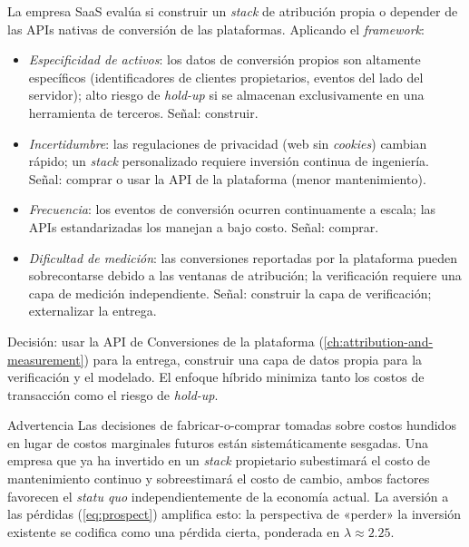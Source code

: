 \begin{example}
La empresa SaaS evalúa si construir un \emph{stack} de atribución propia o depender de las APIs
nativas de conversión de las plataformas. Aplicando el \emph{framework}:
\begin{itemize}
  \item \emph{Especificidad de activos}: los datos de conversión propios son altamente específicos
    (identificadores de clientes propietarios, eventos del lado del servidor); alto riesgo de
    \emph{hold-up} si se almacenan exclusivamente en una herramienta de terceros. Señal: construir.
  \item \emph{Incertidumbre}: las regulaciones de privacidad (web sin \emph{cookies}) cambian
    rápido; un \emph{stack} personalizado requiere inversión continua de ingeniería. Señal: comprar
    o usar la API de la plataforma (menor mantenimiento).
  \item \emph{Frecuencia}: los eventos de conversión ocurren continuamente a escala; las APIs
    estandarizadas los manejan a bajo costo. Señal: comprar.
  \item \emph{Dificultad de medición}: las conversiones reportadas por la plataforma pueden
    sobrecontarse debido a las ventanas de atribución; la verificación requiere una capa de medición
    independiente. Señal: construir la capa de verificación; externalizar la entrega.
\end{itemize}
Decisión: usar la API de Conversiones de la plataforma (\cref{ch:attribution-and-measurement}) para
la entrega, construir una capa de datos propia para la verificación y el modelado. El enfoque
híbrido minimiza tanto los costos de transacción como el riesgo de \emph{hold-up}.
\end{example}

\begin{admonition}{Advertencia}
Las decisiones de fabricar-o-comprar tomadas sobre costos hundidos en lugar de costos marginales
futuros están sistemáticamente sesgadas. Una empresa que ya ha invertido en un \emph{stack}
propietario subestimará el costo de mantenimiento continuo y sobreestimará el costo de cambio,
ambos factores favorecen el \emph{statu quo} independientemente de la economía actual. La aversión
a las pérdidas (\cref{eq:prospect}) amplifica esto: la perspectiva de «perder» la inversión existente
se codifica como una pérdida cierta, ponderada en \(\lambda\approx2.25\).
\end{admonition}

